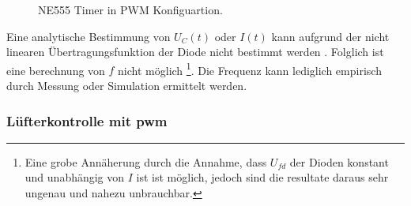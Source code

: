\begin{figure}
    \caption{NE555 Timer in PWM Konfiguartion.}
    \label{fig:ne555-pwm}
\end{figure}

Eine analytische Bestimmung von $U_C(t)$ oder $I(t)$ kann aufgrund der nicht linearen Übertragungsfunktion der Diode nicht bestimmt werden \autocite{rdc}.
Folglich ist eine berechnung von $f$ nicht möglich
\footnote{Eine grobe Annäherung durch die Annahme, dass $U_{fd}$ der Dioden konstant und unabhängig von $I$ ist ist möglich, jedoch sind die resultate daraus sehr ungenau und nahezu unbrauchbar.}.
Die Frequenz kann lediglich empirisch durch Messung oder Simulation ermittelt werden.

\subsubsection{Lüfterkontrolle mit \acrshort{pwm}}
